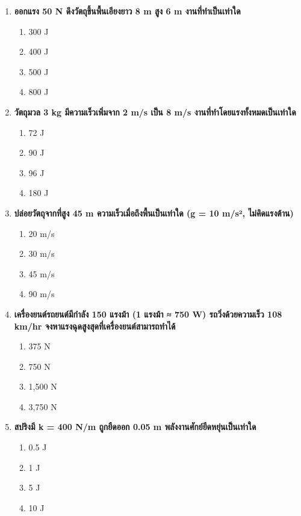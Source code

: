 \documentclass[12pt]{article}
\begin{document}
\begin{enumerate}
\begin{enumerate}[label=\alph*)]
\item 200 W
\item 400 W
\item 2,000 W
\end{enumerate}
\item \textbf{ออกแรง 50 N ดึงวัตถุขึ้นพื้นเอียงยาว 8 m สูง 6 m งานที่ทำเป็นเท่าใด}
\begin{enumerate}[label=\alph*)]
\item 300 J
\item 400 J
\item 500 J
\item 800 J
\end{enumerate}
\item \textbf{วัตถุมวล 3 kg มีความเร็วเพิ่มจาก 2 m/s เป็น 8 m/s งานที่ทำโดยแรงทั้งหมดเป็นเท่าใด}
\begin{enumerate}[label=\alph*)]
\item 72 J
\item 90 J
\item 96 J
\item 180 J
\end{enumerate}
\item \textbf{ปล่อยวัตถุจากที่สูง 45 m ความเร็วเมื่อถึงพื้นเป็นเท่าใด (g = 10 m/s², ไม่คิดแรงต้าน)}
\begin{enumerate}[label=\alph*)]
\item 20 m/s
\item 30 m/s
\item 45 m/s
\item 90 m/s
\end{enumerate}
\item \textbf{เครื่องยนต์รถยนต์มีกำลัง 150 แรงม้า (1 แรงม้า ≈ 750 W) รถวิ่งด้วยความเร็ว 108 km/hr จงหาแรงฉุดสูงสุดที่เครื่องยนต์สามารถทำได้}
\begin{enumerate}[label=\alph*)]
\item 375 N
\item 750 N
\item 1,500 N
\item 3,750 N
\end{enumerate}
\item \textbf{สปริงมี k = 400 N/m ถูกยืดออก 0.05 m พลังงานศักย์ยืดหยุ่นเป็นเท่าใด}
\begin{enumerate}[label=\alph*)]
\item 0.5 J
\item 1 J
\item 5 J
\item 10 J
\end{enumerate}

\end{enumerate}
\end{document}
